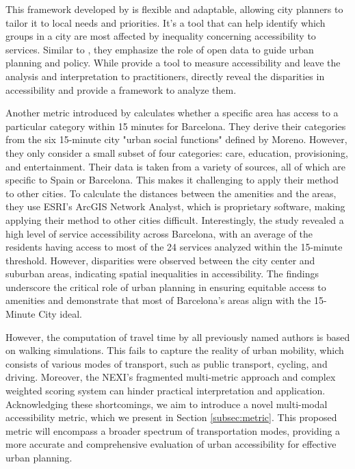 This framework developed by  is flexible and adaptable, allowing city planners to tailor it to local needs and priorities. 
It's a tool that can help identify which groups in a city are most affected by inequality concerning accessibility to services. 
Similar to , they emphasize the role of open data to guide urban planning and policy.
While  provide a tool to measure accessibility and leave the analysis and interpretation to practitioners,  directly reveal the disparities in accessibility and provide a framework to analyze them.

Another metric introduced by  calculates whether a specific area has access to a particular category within 15 minutes for Barcelona.
They derive their categories from the six 15-minute city "urban social functions" defined by Moreno.
However, they only consider a small subset of four categories: care, education, provisioning, and entertainment.
Their data is taken from a variety of sources, all of which are specific to Spain or Barcelona.
This makes it challenging to apply their method to other cities.
To calculate the distances between the amenities and the areas, they use ESRI's ArcGIS Network Analyst, which is proprietary software, making applying their method to other cities difficult.
Interestingly, the study revealed a high level of service accessibility across Barcelona, with an average of the residents having access to most of the 24 services analyzed within the 15-minute threshold. 
However, disparities were observed between the city center and suburban areas, indicating spatial inequalities in accessibility.
The findings underscore the critical role of urban planning in ensuring equitable access to amenities and demonstrate that most of Barcelona's areas align with the 15-Minute City ideal. 

However, the computation of travel time by all previously named authors is based on walking simulations. 
This fails to capture the reality of urban mobility, which consists of various modes of transport, such as public transport, cycling, and driving.
Moreover, the NEXI's fragmented multi-metric approach and complex weighted scoring system can hinder practical interpretation and application.
Acknowledging these shortcomings, we aim to introduce a novel multi-modal accessibility metric, which we present in Section \ref{subsec:metric}.
This proposed metric will encompass a broader spectrum of transportation modes, providing a more accurate and comprehensive evaluation of urban accessibility for effective urban planning.

